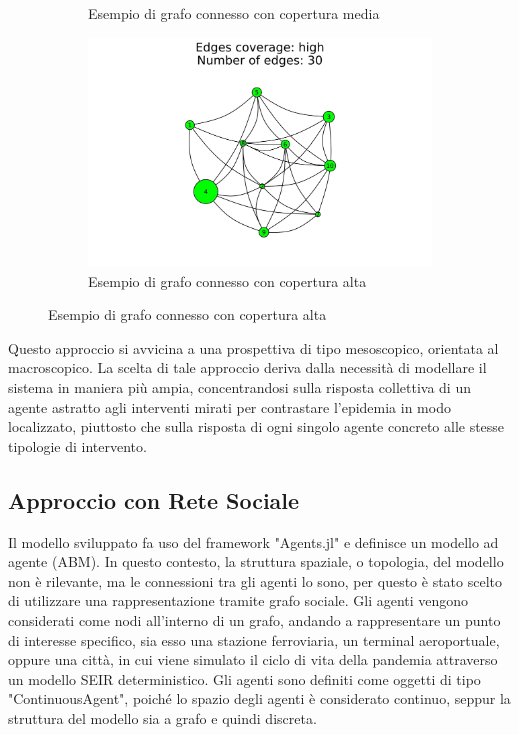 \begin{figure}[H]
\begin{subfigure}[b]{0.3\textwidth}
		\caption{Esempio di grafo connesso con copertura media}
		\label{fig:connected_graph_example_medium}
	\end{subfigure}
	\hfill
	\begin{subfigure}[b]{0.3\textwidth}
		\centering
		\includegraphics[width=\textwidth]{img/high.jpg}
		\caption{Esempio di grafo connesso con copertura alta}
		\label{fig:connected_graph_example_high}
	\end{subfigure}
\end{figure}

Questo approccio si avvicina a una prospettiva di tipo mesoscopico, 
orientata al macroscopico. La scelta di tale approccio deriva dalla 
necessità di modellare il sistema in maniera più ampia, concentrandosi 
sulla risposta collettiva di un agente astratto agli interventi mirati 
per contrastare l'epidemia in modo localizzato, piuttosto che sulla risposta
di ogni singolo agente concreto alle stesse tipologie di intervento.

\subsection{Approccio con Rete Sociale}

Il modello sviluppato fa uso del framework "Agents.jl" \cite{Agents.jl} e 
definisce un modello ad agente (ABM). In questo contesto, la struttura 
spaziale, o topologia, del modello non è rilevante, ma le connessioni tra gli agenti 
lo sono, per questo è  stato scelto di utilizzare una rappresentazione tramite 
grafo sociale. Gli agenti vengono considerati come nodi all'interno di un grafo,
andando a rappresentare un punto di interesse specifico, sia esso 
una stazione ferroviaria, un terminal aeroportuale, oppure una città,
in cui viene simulato il ciclo di vita della pandemia attraverso un 
modello SEIR deterministico. Gli agenti sono definiti come oggetti di tipo 
"ContinuousAgent", poiché lo spazio degli agenti è considerato continuo,
seppur la struttura del modello sia a grafo e quindi discreta.

